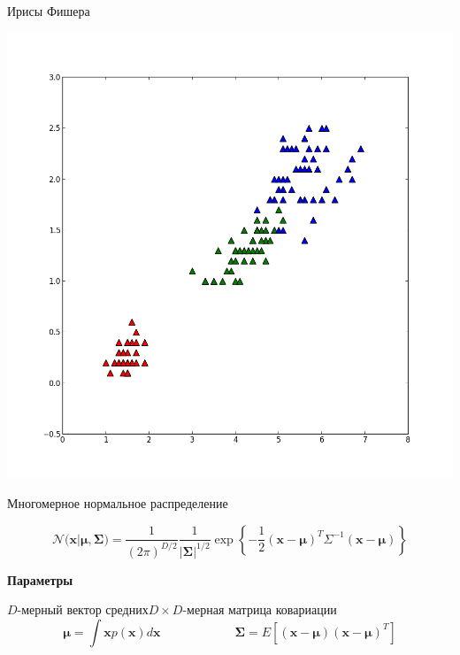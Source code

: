 \documentclass[10pt]{beamer}
\begin{document}
\begin{frame}{Ирисы Фишера}
\begin{center}
\includegraphics[scale=0.2]{images/iris23.png}
\end{center}

\end{frame}

\begin{frame}{Многомерное нормальное распределение}

\[
\mathcal{N(\mathbf{x} | \mathbf{\mu}, \mathbf{\Sigma}}) = \frac{1}{(2 \pi)^{D/2}} \frac{1}{|\mathbf{\Sigma}|^{1/2}} \exp \left\{-\frac{1}{2}(\mathbf{x} - \mathbf{\mu})^T \Sigma^{-1} (\mathbf{x} - \mathbf{\mu})\right\}
\]

\vspace{0.7em}
\begin{center}
{\bf Параметры}
\end{center}
\quad${D}$-мерный вектор средних\qquad$D \times D$-мерная матрица ковариации 
\[
\mathbf{\mu} = \int \mathbf{x} p({\mathbf{x}}) d\mathbf{x}
\qquad\qquad\qquad
\mathbf{\Sigma} = E[(\mathbf{x} - \mathbf{\mu})(\mathbf{x} - \mathbf{\mu})^T]
\]

\end{frame}
\end{document}
